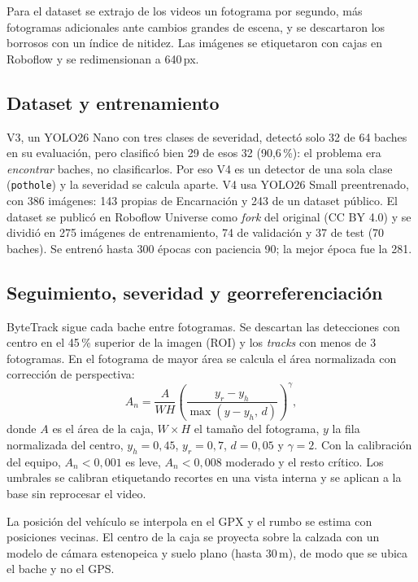 \documentclass[conference]{IEEEtran}
\begin{document}
Para el dataset se extrajo de los videos un fotograma por segundo, más
fotogramas adicionales ante cambios grandes de escena, y se descartaron los
borrosos con un índice de nitidez. Las imágenes se etiquetaron con cajas en
Roboflow \cite{roboflow} y se redimensionan a 640\,px.

\subsection{Dataset y entrenamiento}
V3, un YOLO26 Nano con tres clases de severidad, detectó solo 32 de 64 baches
en su evaluación, pero clasificó bien 29 de esos 32 (90,6\,\%): el problema era
\emph{encontrar} baches, no clasificarlos. Por eso V4 es un detector de una sola
clase (\texttt{pothole}) y la severidad se calcula aparte. V4 usa YOLO26 Small
\cite{ultralytics} preentrenado, con 386 imágenes: 143 propias de Encarnación y
243 de un dataset público. El dataset se publicó en Roboflow Universe como
\emph{fork} del original (CC BY 4.0) \cite{dataset2026} y se dividió en 275
imágenes de entrenamiento, 74 de validación y 37 de test (70 baches). Se entrenó
hasta 300 épocas con paciencia 90; la mejor época fue la 281.

\subsection{Seguimiento, severidad y georreferenciación}
ByteTrack \cite{zhang2022} sigue cada bache entre fotogramas. Se descartan las
detecciones con centro en el 45\,\% superior de la imagen (ROI) y los
\emph{tracks} con menos de 3 fotogramas. En el fotograma de mayor área se
calcula el área normalizada con corrección de perspectiva:
\begin{equation}
A_{n} = \frac{A}{W H}\left(\frac{y_{r}-y_{h}}{\max(y-y_{h},\,d)}\right)^{\gamma},
\end{equation}
donde $A$ es el área de la caja, $W\times H$ el tamaño del fotograma, $y$ la
fila normalizada del centro, $y_h=0{,}45$, $y_r=0{,}7$, $d=0{,}05$ y
$\gamma=2$. Con la calibración del equipo, $A_n<0{,}001$ es leve,
$A_n<0{,}008$ moderado y el resto crítico. Los umbrales se calibran etiquetando
recortes en una vista interna y se aplican a la base sin reprocesar el video.

La posición del vehículo se interpola en el GPX y el rumbo se estima con
posiciones vecinas. El centro de la caja se proyecta sobre la calzada con un
modelo de cámara estenopeica y suelo plano (hasta 30\,m), de modo que se ubica
el bache y no el GPS.
\end{document}
